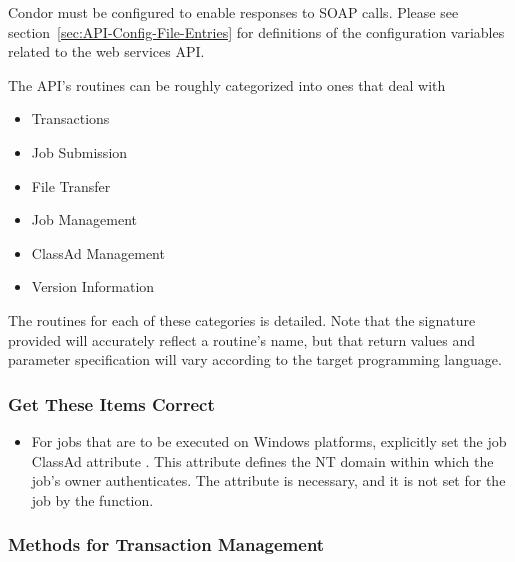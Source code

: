 Condor must be configured to enable responses to SOAP calls.
Please see 
section~\ref{sec:API-Config-File-Entries} for definitions of the
configuration variables related to the web services API.

The API's routines can be roughly categorized into ones that
deal with
\begin{itemize}
  \item Transactions
  \item Job Submission
  \item File Transfer
  \item Job Management
  \item ClassAd Management
  \item Version Information
\end{itemize}
The routines for each of these categories is detailed.
Note that the signature provided will accurately 
reflect a routine's name, 
but that return values and parameter specification
will vary according  to the target programming language.

\subsubsection{\label{WebService-Gotchas} Get These Items Correct}

\begin{itemize}
\item For jobs that are to be executed on Windows platforms,
  explicitly set the job ClassAd attribute .
  This attribute defines the NT domain within which the
  job's owner authenticates.  The attribute is necessary,
  and it is not set for the job by the 
  function.

\end{itemize}


\subsubsection{\label{WebService-Transactions} Methods for Transaction Management}


